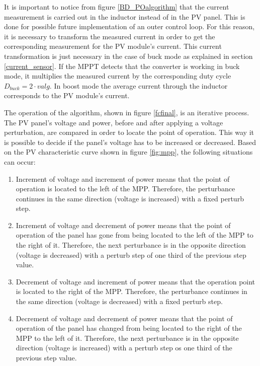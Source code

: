 It is important to notice from figure \ref{BD_POalgorithm} that the current measurement is carried out in the inductor instead of in the PV panel. This is done for possible future implementation of an outer control loop. For this reason, it is necessary to transform the measured current in order to get the corresponding measurement for the PV module's current. This current transformation is just necessary in the case of buck mode as explained in section \ref{current_sensor}. If the MPPT detects that the converter is working in buck mode, it multiplies the measured current by the corresponding duty cycle $D_{buck}=2\cdot valg$. In boost mode the average current through the inductor corresponds to the PV module's current. 

The operation of the algorithm, shown in figure \ref{fcfinal}, is an iterative process. The PV panel's voltage and power, before and after applying a voltage perturbation, are compared  in order to locate the point of operation. This way it is possible to decide if the panel's voltage has to be increased or decreased. Based on the PV characteristic curve shown in figure \ref{fig:mpp}, the following situations can occur:

\begin{enumerate}
	\item Increment of voltage and increment of power means that the point of operation is located to the left of the MPP. Therefore, the perturbance continues in the same direction (voltage is increased) with a fixed perturb step. 
	\item Increment of voltage and decrement of power means that the point of operation of the panel has gone from being located to the left of the MPP to the right of it. Therefore, the next perturbance is in the opposite direction (voltage is decreased) with a perturb step of one third of the previous step value.
	\item Decrement of voltage and increment of power means that the operation point is located to the right of the MPP. Therefore, the perturbance continues in the same direction (voltage is decreased) with a fixed perturb step. 
	\item Decrement of voltage and decrement of power means that the point of operation of the panel has changed from being located to the right of the MPP to the left of it. Therefore, the next perturbance is in the opposite direction (voltage is increased) with a perturb step os one third of the previous step value.
\end{enumerate}

